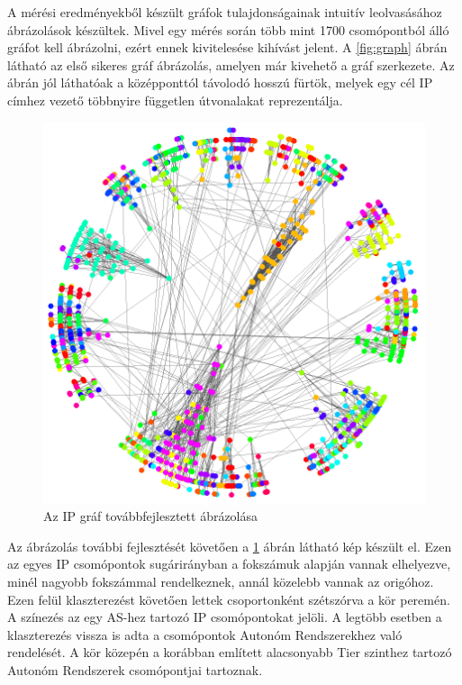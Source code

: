 A mérési eredményekből készült gráfok tulajdonságainak intuitív leolvasásához ábrázolások készültek. Mivel egy mérés során több mint 1700 csomópontból álló gráfot kell ábrázolni, ezért ennek kivitelesése kihívást jelent. A \ref{fig:graph} ábrán látható az első sikeres gráf ábrázolás, amelyen már kivehető a gráf szerkezete.
Az ábrán jól láthatóak a középponttól távolodó hosszú fürtök, melyek egy cél IP címhez vezető többnyire független útvonalakat reprezentálja.

\pagebreak


\begin{figure}[!h]
	\centering
	\includegraphics[width=1\textwidth, keepaspectratio]{figures/as-graph2.png}
	\caption{Az IP gráf továbbfejlesztett ábrázolása\label{fig:ip-graph}}
\end{figure}

Az ábrázolás további fejlesztését követően a \ref{fig:ip-graph} ábrán látható kép készült el. Ezen az egyes IP csomópontok sugárirányban a fokszámuk alapján vannak elhelyezve, minél nagyobb fokszámmal rendelkeznek, annál közelebb vannak az origóhoz. Ezen felül klaszterezést követően lettek csoportonként szétszórva a kör peremén. A színezés az egy AS-hez tartozó IP csomópontokat jelöli. A legtöbb esetben a klaszterezés vissza is adta a csomópontok Autonóm Rendszerekhez való rendelését. A kör közepén a korábban említett alacsonyabb Tier szinthez tartozó Autonóm Rendszerek csomópontjai tartoznak.

